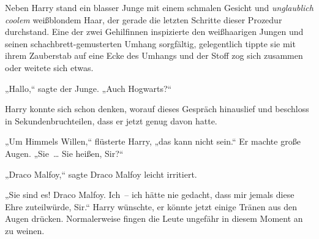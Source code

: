 Neben Harry stand ein blasser Junge mit einem schmalen Gesicht und \emph{unglaublich coolem} weißblondem Haar, der gerade die letzten Schritte dieser Prozedur durchstand. Eine der zwei Gehilfinnen inspizierte den weißhaarigen Jungen und seinen schachbrett-gemusterten Umhang sorgfältig, gelegentlich tippte sie mit ihrem Zauberstab auf eine Ecke des Umhangs und der Stoff zog sich zusammen oder weitete sich etwas.

„Hallo,“ sagte der Junge. „Auch Hogwarts?“

Harry konnte sich schon denken, worauf dieses Gespräch hinauslief und beschloss in Sekundenbruchteilen, dass er jetzt genug davon hatte.

„Um Himmels Willen,“ flüsterte Harry, „das kann nicht sein.“ Er machte große Augen. „Sie … Sie heißen, Sir?“

„Draco Malfoy,“ sagte Draco Malfoy leicht irritiert.

„Sie sind es! Draco Malfoy. Ich – ich hätte nie gedacht, dass mir jemals diese Ehre zuteilwürde, Sir.“ Harry wünschte, er könnte jetzt einige Tränen aus den Augen drücken. Normalerweise fingen die Leute ungefähr in diesem Moment an zu weinen.

